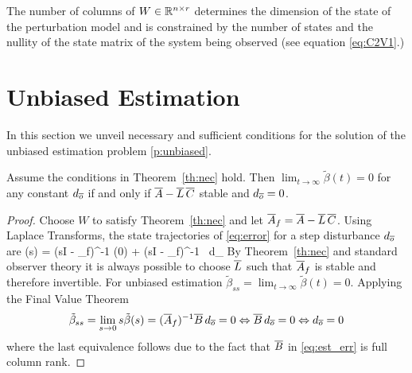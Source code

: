 \documentclass[preprint,review,11pt]{elsarticle}
\begin{document}
\begin{rem} The number of columns of $W\in{\mathbb{R}^{n \times r}}$ determines the dimension of the state of the perturbation model and is constrained by the number of states and the nullity of the state matrix of the system being observed (see equation \eqref{eq:C2V1}.)
\end{rem}

\section{Unbiased Estimation}
In this section we unveil necessary and sufficient conditions for the solution of the  unbiased estimation problem \ref{p:unbiased}. 



\begin{thm} \label{th:p1}
Assume the conditions in Theorem~\ref{th:nec} hold.
Then $\lim_{t \rightarrow \infty} \tilde{\beta}(t)=0$ for any constant $d_{\overline{o}}$ if and only if $\overline{A} - \overline{L}\, \overline{C}$ stable and $d_{\overline{o}}=0$.
\end{thm}

\begin{proof}
Choose $W$ to satisfy Theorem~\ref{th:nec} and let $\overline{A}_f=\overline{A}-\overline{L} \, \overline{C}$.  Using Laplace Transforms, the state trajectories of \eqref{eq:error} for a step disturbance $d_{\overline{o}}$ are
\be
\tilde{\beta}(s) 
=  
(sI - _{f})^{-1} \tilde{\beta}(0)  
+ 
(sI - _{f})^{-1}  \, 
d_{}
\ee
By Theorem~\ref{th:nec} and standard observer theory it is always possible to choose $\overline{L}$ such that $\overline{A}_{f}$ is stable and therefore invertible.  
For unbiased estimation $\tilde{\beta}_{ss}  = \lim_{t\rightarrow \infty} \tilde{\beta}(t) =0$. Applying the Final Value Theorem
\begin{align}
\tilde{\beta}_{ss}  
= 
\lim_{s \rightarrow 0 } s \tilde{\beta}(s) 
=
  (\overline{A}_{f})^{-1} \overline{B} \,  d_{\overline{o}} = 0
  \Leftrightarrow 
  \overline{B} \,  d_{\overline{o}} = 0 \Leftrightarrow  d_{\overline{o}} = 0
\label{eq:thm3}
\end{align}
where the last equivalence follows due to the fact  that $\overline{B}$ in \eqref{eq:est_err} is full column rank.
\end{proof}

\end{document}
